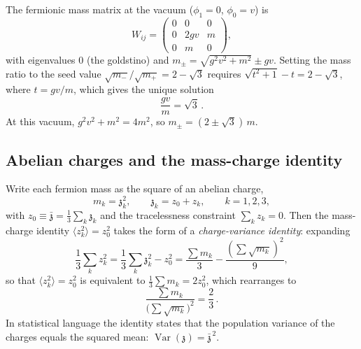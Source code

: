 \documentclass[12pt,a4paper]{article}
\newcommand{\zch}{\mathfrak{z}}
\begin{document}
The fermionic mass matrix at the vacuum ($\phi_1 = 0$,
$\phi_0 = v$) is
\begin{equation}
  W_{ij} = \begin{pmatrix} 0 & 0 & 0 \\ 0 & 2gv & m \\ 0 & m & 0 \end{pmatrix},
\end{equation}
with eigenvalues $0$ (the goldstino) and $m_\pm = \sqrt{g^2v^2 + m^2} \pm gv$.
Setting the mass ratio to the seed value
$\sqrt{m_-}/\sqrt{m_+} = 2 - \sqrt{3}$
requires $\sqrt{t^2+1} - t = 2 - \sqrt{3}$, where $t = gv/m$,
which gives the unique solution
\begin{equation}
  \frac{gv}{m} = \sqrt{3}\,.
\end{equation}
At this vacuum, $g^2v^2 + m^2 = 4m^2$, so
$m_\pm = (2 \pm \sqrt{3})\,m$.

\subsection{Abelian charges and the mass-charge identity}

Write each fermion mass as the square of an abelian charge,
\begin{equation}\label{eq:mass-charge-def}
  m_k = \zch_k^2, \qquad \zch_k = z_0 + z_k, \qquad k=1,2,3,
\end{equation}
with $z_0 \equiv \bar{\zch} = \tfrac{1}{3}\sum_k \zch_k$ and the tracelessness
constraint $\sum_k z_k = 0$.
Then the mass-charge identity $\langle z_k^2\rangle = z_0^2$ takes the form of a
\emph{charge-variance identity}: expanding
\begin{equation}
  \frac{1}{3}\sum_k z_k^2
  = \frac{1}{3}\sum_k \zch_k^2 - z_0^2
  = \frac{\sum m_k}{3} - \frac{(\sum\sqrt{m_k})^2}{9} ,
\end{equation}
so that
$\langle z_k^2 \rangle = z_0^2$ is equivalent to
$\tfrac{1}{3}\sum m_k = 2z_0^2$, which rearranges to
\begin{equation}
\boxed{
  \frac{\sum m_k}{\bigl(\sum\sqrt{m_k}\bigr)^2} = \frac{2}{3}
}\,.
\end{equation}
In statistical language the identity states that the population variance of
the charges equals the squared mean:
$\operatorname{Var}(\zch) = \bar{\zch}^{\,2}$.
\end{document}
